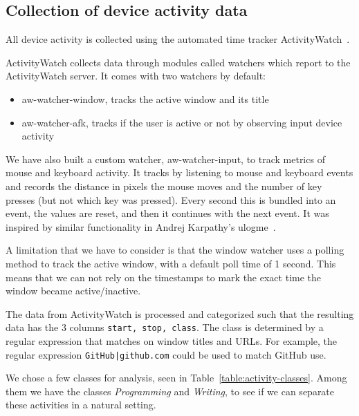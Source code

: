     \vfill
    \pagebreak
    \subsection{Collection of device activity data}\label{section:collect-usage}

        All device activity is collected using the automated time tracker ActivityWatch~\cite{bjareholt_activitywatch_2020-1}.

        \begin{minipage}{\textwidth}
        ActivityWatch collects data through modules called watchers which report to the ActivityWatch server. It comes with two watchers by default:

        \begin{itemize}
            \item aw-watcher-window, tracks the active window and its title
            \item aw-watcher-afk, tracks if the user is active or not by observing input device activity
        \end{itemize}
        \end{minipage}

        We have also built a custom watcher, aw-watcher-input, to track metrics of mouse and keyboard activity. It tracks by listening to mouse and keyboard events and records the distance in pixels the mouse moves and the number of key presses (but not which key was pressed). Every second this is bundled into an event, the values are reset, and then it continues with the next event. It was inspired by similar functionality in Andrej Karpathy's ulogme~\cite{karpathy_ulogme_2016}.

        A limitation that we have to consider is that the window watcher uses a polling method to track the active window, with a default poll time of 1 second. This means that we can not rely on the timestamps to mark the exact time the window became active/inactive.

        The data from ActivityWatch is processed and categorized such that the resulting data has the 3 columns \texttt{start, stop, class}. The class is determined by a regular expression that matches on window titles and URLs. For example, the regular expression \texttt{GitHub|github.com} could be used to match GitHub use.

We chose a few classes for analysis, seen in Table~\ref{table:activity-classes}. Among them we have the classes \emph{Programming} and \emph{Writing}, to see if we can separate these activities in a natural setting.

